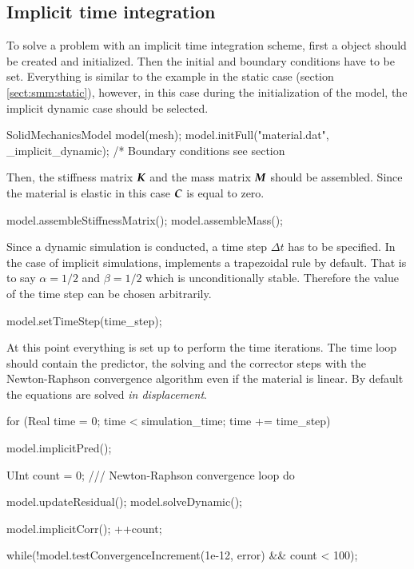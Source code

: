 

\subsection{Implicit time integration}
To  solve  a  problem  with   an  implicit  time  integration  scheme,  first  a
 object  should be created and  initialized.  Then the
initial and  boundary conditions have to  be set.  Everything is  similar to the
example  in the static  case (section  \ref{sect:smm:static}), however,  in this
case during the initialization of the model, the implicit dynamic case should be
selected.

\begin{cpp}
  SolidMechanicsModel model(mesh);
  model.initFull("material.dat", _implicit_dynamic);
  /* Boundary conditions see section %
\end{cpp}

Then, the  stiffness matrix  $\boldsymbol{K}$ and the  mass matrix $\boldsymbol{M}$  should be
assembled.  Since  the material is  elastic in this  case $\boldsymbol{C}$ is  equal to
zero.
\begin{cpp}
  model.assembleStiffnessMatrix();
  model.assembleMass();
\end{cpp}

Since  a dynamic  simulation is  conducted, a  time step  $\Delta t$  has  to be
specified. In the case of  implicit simulations, \akantu implements a trapezoidal
rule by  default.  That  is to say  $\alpha =  1/2$ and $\beta  = 1/2$  which is
unconditionally  stable. Therefore  the value  of the  time step  can  be chosen
arbitrarily.  
\begin{cpp}
  model.setTimeStep(time_step);
\end{cpp}

At this point everything is set up to perform the time iterations. The time loop
should  contain the  predictor, the  solving and  the corrector  steps  with the
Newton-Raphson convergence algorithm even if the material is linear.  By default
the        equations       are       solved        \emph{in       displacement}.
\begin{cpp}
  for (Real time = 0; time < simulation_time; time += time_step) {
    model.implicitPred();

    UInt count = 0;
    /// Newton-Raphson convergence loop
    do {
      model.updateResidual();
      model.solveDynamic();

      model.implicitCorr();
      ++count;
    } while(!model.testConvergenceIncrement(1e-12, error) && count < 100);
  }
\end{cpp}

